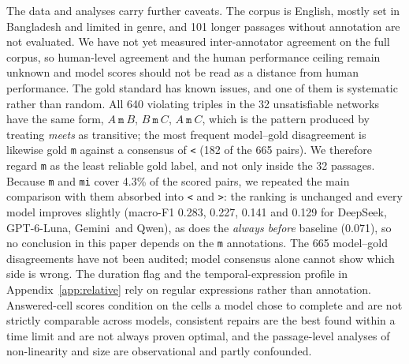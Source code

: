 \documentclass[11pt]{article}
\newcommand{\rel}[1]{\texttt{#1}}
\newcommand{\Ds}{DeepSeek}
\newcommand{\Gp}{GPT-6-Luna}
\newcommand{\Gm}{Gemini}
\newcommand{\Qw}{Qwen}
\begin{document}
The data and analyses carry further caveats. The corpus is English, mostly set in Bangladesh and limited in genre, and 101 longer passages without annotation are not evaluated. We have not yet measured inter-annotator agreement on the full corpus, so human-level agreement and the human performance ceiling remain unknown and model scores should not be read as a distance from human performance. The gold standard has known issues, and one of them is systematic rather than random. All 640 violating triples in the 32 unsatisfiable networks have the same form, $A\ \rel{m}\ B$, $B\ \rel{m}\ C$, $A\ \rel{m}\ C$, which is the pattern produced by treating \emph{meets} as transitive; the most frequent model--gold disagreement is likewise gold \rel{m} against a consensus of \rel{<} (182 of the 665 pairs). We therefore regard \rel{m} as the least reliable gold label, and not only inside the 32 passages. Because \rel{m} and \rel{mi} cover 4.3\% of the scored pairs, we repeated the main comparison with them absorbed into \rel{<} and \rel{>}: the ranking is unchanged and every model improves slightly (macro-F1 0.283, 0.227, 0.141 and 0.129 for \Ds, \Gp, \Gm\ and \Qw), as does the \emph{always before} baseline (0.071), so no conclusion in this paper depends on the \rel{m} annotations. The 665 model--gold disagreements have not been audited; model consensus alone cannot show which side is wrong. The duration flag and the temporal-expression profile in Appendix~\ref{app:relative} rely on regular expressions rather than annotation. Answered-cell scores condition on the cells a model chose to complete and are not strictly comparable across models, consistent repairs are the best found within a time limit and are not always proven optimal, and the passage-level analyses of non-linearity and size are observational and partly confounded.
\end{document}
